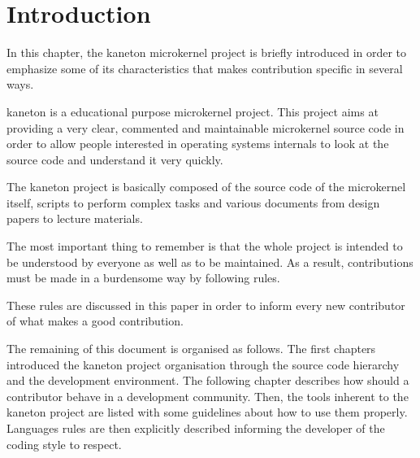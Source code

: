 %
%
%
%
%
%

%
%

\chapter{Introduction}

In this chapter, the kaneton microkernel project is briefly introduced
in order to emphasize some of its characteristics that makes contribution
specific in several ways.

\newpage

%
%

kaneton is a educational purpose microkernel project. This project aims
at providing a very clear, commented and maintainable microkernel source
code in order to allow people interested in operating systems internals
to look at the source code and understand it very quickly.

The kaneton project is basically composed of the source code of the
microkernel itself, scripts to perform complex tasks and various documents
from design papers to lecture materials.

The most important thing to remember is that the whole project is intended
to be understood by everyone as well as to be maintained. As a result,
contributions must be made in a burdensome way by following rules.

These rules are discussed in this paper in order to inform every new
contributor of what makes a good contribution.

The remaining of this document is organised as follows. The first chapters
introduced the kaneton project organisation through the source code hierarchy
and the development environment. The following chapter describes how should a
contributor behave in a development community. Then, the tools inherent to
the kaneton project are listed with some guidelines about how to use them
properly. Languages rules are then explicitly described informing the
developer of the coding style to respect.
